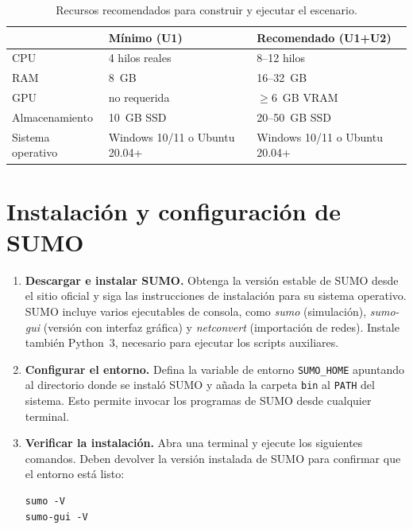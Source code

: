 \begin{table}[H]
\centering
\begin{tabular}{p{3.5cm}p{5cm}p{5cm}}
\hline
 & \textbf{Mínimo (U1)} & \textbf{Recomendado (U1+U2)} \\
\hline
CPU & 4 hilos reales & 8--12 hilos \\
RAM & 8~GB & 16--32~GB \\
GPU & no requerida & $\geq$6~GB VRAM \\
Almacenamiento & 10~GB SSD & 20--50~GB SSD \\
Sistema operativo & Windows 10/11 o Ubuntu 20.04+ & Windows 10/11 o Ubuntu 20.04+ \\
\hline
\end{tabular}
\caption{Recursos recomendados para construir y ejecutar el escenario.}
\label{tab:hw}
\end{table}

\section{Instalación y configuración de SUMO}

\begin{enumerate}
  \item \textbf{Descargar e instalar SUMO.} Obtenga la versión estable
    de SUMO desde el sitio oficial y siga las instrucciones de
    instalación para su sistema operativo.  SUMO incluye varios
    ejecutables de consola, como \emph{sumo} (simulación),
    \emph{sumo-gui} (versión con interfaz gráfica) y
    \emph{netconvert} (importación de redes).
    Instale también Python~3, necesario para ejecutar los
    scripts auxiliares.

  \item \textbf{Configurar el entorno.} Defina la variable de
    entorno \verb|SUMO_HOME| apuntando al directorio donde se instaló
    SUMO y añada la carpeta \verb|bin| al \verb|PATH| del sistema.
    Esto permite invocar los programas de SUMO desde cualquier
    terminal.

  \item \textbf{Verificar la instalación.} Abra una terminal y ejecute
    los siguientes comandos.  Deben devolver la versión instalada de
    SUMO para confirmar que el entorno está listo:

    \begin{verbatim}
sumo -V
sumo-gui -V
    \end{verbatim}
\end{enumerate}


